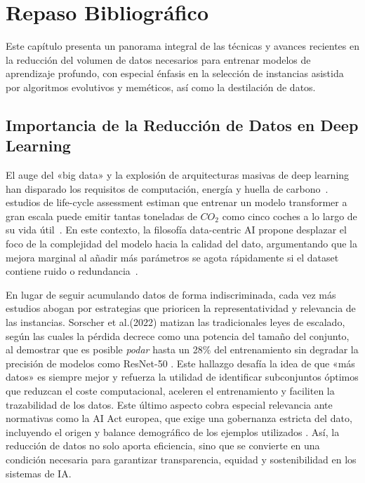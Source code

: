 
\chapter{Repaso Bibliográfico}\label{ch:repaso-bibliografico}
Este capítulo presenta un panorama integral de las técnicas y avances recientes en la reducción del volumen de datos necesarios para entrenar modelos de aprendizaje profundo,
con especial énfasis en la selección de instancias asistida por algoritmos evolutivos y meméticos, así como la destilación de datos.


\section{Importancia de la Reducción de Datos en Deep Learning}
El auge del «big data» y la explosión de arquitecturas masivas de deep learning han disparado los requisitos de computación,
energía y huella de carbono~\cite{pattersonCarbonEmissionsLarge2021}.
estudios de life-cycle assessment estiman que entrenar un modelo transformer a gran escala puede emitir tantas toneladas de $CO_2$
como cinco coches a lo largo de su vida útil~\cite{strubellEnergyPolicyConsiderations2019}.
En este contexto, la filosofía data-centric AI propone desplazar el foco de la complejidad del modelo hacia la calidad del dato, argumentando que la mejora marginal al añadir más parámetros se agota rápidamente si el dataset contiene ruido o redundancia~\cite{zhaDatacentricArtificialIntelligence2023}.

En lugar de seguir acumulando datos de forma indiscriminada, cada vez más estudios abogan por estrategias que prioricen la representatividad y relevancia de las instancias.
Sorscher et al.(2022) matizan las tradicionales leyes de escalado, según las cuales la pérdida decrece como una potencia del tamaño del conjunto, al demostrar que es posible \textit{podar} hasta un 28\% del entrenamiento sin degradar la precisión de modelos como ResNet-50 \cite{sorscherNeuralScalingLaws2023}.
Este hallazgo desafía la idea de que «más datos» es siempre mejor y refuerza la utilidad de identificar subconjuntos óptimos que reduzcan el coste computacional, aceleren el entrenamiento y faciliten la trazabilidad de los datos.
Este último aspecto cobra especial relevancia ante normativas como la AI Act europea, que exige una gobernanza estricta del dato, incluyendo el origen y balance demográfico de los ejemplos utilizados \cite{euAIAct2024}.
Así, la reducción de datos no solo aporta eficiencia, sino que se convierte en una condición necesaria para garantizar transparencia, equidad y sostenibilidad en los sistemas de IA.


